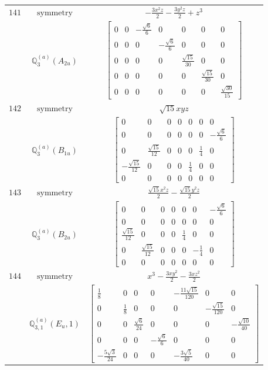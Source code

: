 \documentclass[fleqn,8pt,landscape]{jsarticle}
\begin{document}
\begin{longtable}{ccc}
$ 141 $ & $ \text{symmetry} $ & $ - \frac{3 x^{2} z}{2} - \frac{3 y^{2} z}{2} + z^{3} $ \\
$  $ & $ \mathbb{Q}_{3}^{(a)}(A_{2u}) $ & $ \begin{bmatrix} 0 & 0 & - \frac{\sqrt{6}}{6} & 0 & 0 & 0 & 0 \\ 0 & 0 & 0 & - \frac{\sqrt{6}}{6} & 0 & 0 & 0 \\ 0 & 0 & 0 & 0 & \frac{\sqrt{15}}{30} & 0 & 0 \\ 0 & 0 & 0 & 0 & 0 & \frac{\sqrt{15}}{30} & 0 \\ 0 & 0 & 0 & 0 & 0 & 0 & \frac{\sqrt{30}}{15} \end{bmatrix} $ \\ \hline
$ 142 $ & $ \text{symmetry} $ & $ \sqrt{15} x y z $ \\
$  $ & $ \mathbb{Q}_{3}^{(a)}(B_{1u}) $ & $ \begin{bmatrix} 0 & 0 & 0 & 0 & 0 & 0 & 0 \\ 0 & 0 & 0 & 0 & 0 & 0 & - \frac{\sqrt{6}}{6} \\ 0 & \frac{\sqrt{15}}{12} & 0 & 0 & 0 & \frac{1}{4} & 0 \\ - \frac{\sqrt{15}}{12} & 0 & 0 & 0 & \frac{1}{4} & 0 & 0 \\ 0 & 0 & 0 & 0 & 0 & 0 & 0 \end{bmatrix} $ \\ \hline
$ 143 $ & $ \text{symmetry} $ & $ \frac{\sqrt{15} x^{2} z}{2} - \frac{\sqrt{15} y^{2} z}{2} $ \\
$  $ & $ \mathbb{Q}_{3}^{(a)}(B_{2u}) $ & $ \begin{bmatrix} 0 & 0 & 0 & 0 & 0 & 0 & - \frac{\sqrt{6}}{6} \\ 0 & 0 & 0 & 0 & 0 & 0 & 0 \\ \frac{\sqrt{15}}{12} & 0 & 0 & 0 & \frac{1}{4} & 0 & 0 \\ 0 & \frac{\sqrt{15}}{12} & 0 & 0 & 0 & - \frac{1}{4} & 0 \\ 0 & 0 & 0 & 0 & 0 & 0 & 0 \end{bmatrix} $ \\ \hline
$ 144 $ & $ \text{symmetry} $ & $ x^{3} - \frac{3 x y^{2}}{2} - \frac{3 x z^{2}}{2} $ \\
$  $ & $ \mathbb{Q}_{3,1}^{(a)}(E_{u},1) $ & $ \begin{bmatrix} \frac{1}{8} & 0 & 0 & 0 & - \frac{11 \sqrt{15}}{120} & 0 & 0 \\ 0 & \frac{1}{8} & 0 & 0 & 0 & - \frac{\sqrt{15}}{120} & 0 \\ 0 & 0 & \frac{\sqrt{6}}{24} & 0 & 0 & 0 & - \frac{\sqrt{10}}{40} \\ 0 & 0 & 0 & - \frac{\sqrt{6}}{6} & 0 & 0 & 0 \\ - \frac{5 \sqrt{3}}{24} & 0 & 0 & 0 & - \frac{3 \sqrt{5}}{40} & 0 & 0 \end{bmatrix} $ \\ \hline

\end{longtable}
\end{document}
